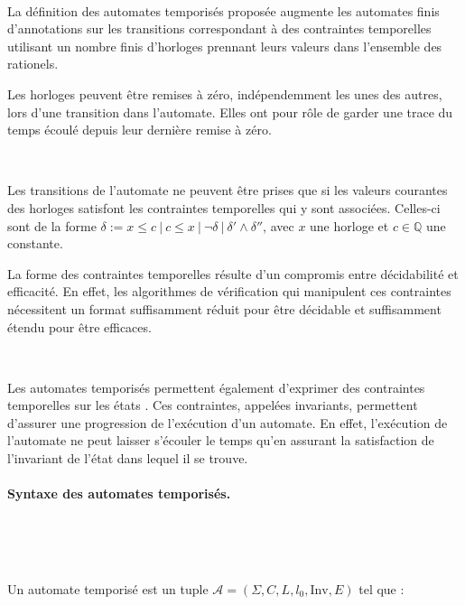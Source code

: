 \documentclass{article}
\begin{document}
      
      ~

      La définition des automates temporisés proposée augmente les automates
      finis d'annotations sur les transitions correspondant à des contraintes
      temporelles utilisant un nombre finis d'horloges prennant leurs valeurs
      dans l'ensemble des rationels.

      Les horloges peuvent être remises à zéro, indépendemment les unes des
      autres, lors d'une transition dans l'automate. Elles ont pour rôle de
      garder une trace du temps écoulé depuis leur dernière remise à zéro.

      ~

      Les transitions de l'automate ne peuvent être prises que si les valeurs
      courantes des horloges satisfont les contraintes temporelles qui y sont
      associées. Celles-ci sont de la forme $\delta := x \le c ~|~ c \le x ~|~
      \neg \delta ~|~ \delta' \wedge \delta''$, avec $x$ une horloge et $c \in
      \mathbb{Q}$ une constante.

      La forme des contraintes temporelles résulte d'un compromis entre
      décidabilité et efficacité. En effet, les algorithmes de vérification qui
      manipulent ces contraintes nécessitent un format suffisamment réduit pour
      être décidable et suffisamment étendu pour être efficaces.
      
      ~

      Les automates temporisés permettent également d'exprimer des contraintes
      temporelles sur les états \cite{henzinger94}. Ces contraintes, appelées
      invariants, permettent d'assurer une progression de l'exécution d'un
      automate. En effet, l'exécution de l'automate ne peut laisser s'écouler le
      temps qu'en assurant la satisfaction de l'invariant de l'état dans lequel
      il se trouve.
      
      \paragraph{Syntaxe des automates temporisés.} ~

        ~

        \noindent
        Un automate temporisé est un tuple $\mathcal{A} =
        (\Sigma,C,L,l_0,\mathrm{Inv},E)$ tel que :
\end{document}
